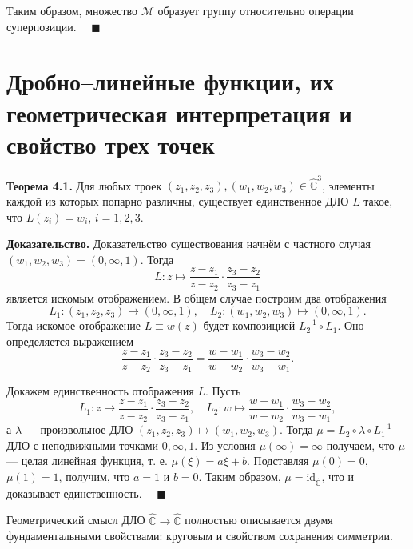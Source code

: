 \documentclass[12pt, a4paper]{article}
\theoremstyle{definition}
\theoremstyle{remark}
\begin{document}
Таким образом, множество $\mathcal{M}$ образует группу относительно операции суперпозиции. $\quad \blacksquare$

\newpage
\section{Дробно–линейные функции, их геометрическая интерпретация и свойство трех точек}
\textbf{Теорема 4.1.} Для любых троек $(z_1, z_2, z_3), (w_1, w_2, w_3) \in \hat{\mathbb{C}}^3$, элементы каждой из которых попарно различны, существует единственное ДЛО $L$ такое, что $L(z_i) = w_i$, $i = 1, 2, 3$.

\textbf{Доказательство.} Доказательство существования начнём с частного случая $(w_1, w_2, w_3) = (0, \infty, 1)$. Тогда
\[
L : z \mapsto \frac{z - z_1}{z - z_2} \cdot \frac{z_3 - z_2}{z_3 - z_1}
\]
является искомым отображением. В общем случае построим два отображения
\[
L_1 : (z_1, z_2, z_3) \mapsto (0, \infty, 1), \quad L_2 : (w_1, w_2, w_3) \mapsto (0, \infty, 1).
\]
Тогда искомое отображение $L \equiv w(z)$ будет композицией $L_2^{-1} \circ L_1$. Оно определяется выражением
\begin{equation}
	\frac{z - z_1}{z - z_2} \cdot \frac{z_3 - z_2}{z_3 - z_1} = \frac{w - w_1}{w - w_2} \cdot \frac{w_3 - w_2}{w_3 - w_1}.
\end{equation}

Докажем единственность отображения $L$. Пусть
\[
L_1 : z \mapsto \frac{z - z_1}{z - z_2} \cdot \frac{z_3 - z_2}{z_3 - z_1}, \quad L_2 : w \mapsto \frac{w - w_1}{w - w_2} \cdot \frac{w_3 - w_2}{w_3 - w_1},
\]
а $\lambda$ — произвольное ДЛО $(z_1, z_2, z_3) \mapsto (w_1, w_2, w_3)$. Тогда $\mu = L_2 \circ \lambda \circ L_1^{-1}$ — ДЛО с неподвижными точками $0, \infty, 1$. Из условия $\mu(\infty) = \infty$ получаем, что $\mu$ — целая линейная функция, т. е. $\mu(\xi) = a\xi + b$. Подставляя $\mu(0) = 0$, $\mu(1) = 1$, получим, что $a = 1$ и $b = 0$. Таким образом, $\mu = \text{id}_{\hat{\mathbb{C}}}$, что и доказывает единственность. $\quad \blacksquare$

Геометрический смысл ДЛО $\hat{\mathbb{C}} \to \hat{\mathbb{C}}$ полностью описывается двумя фундаментальными свойствами: круговым и свойством сохранения симметрии.
\end{document}
